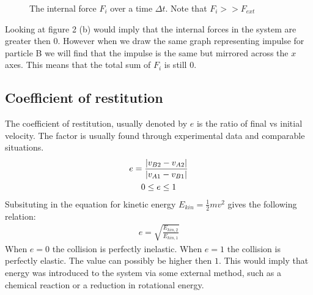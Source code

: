 \documentclass[11pt, a4paper]{article}
\begin{document}
\begin{figure}[h]
  \centering
  \qquad
  \caption{The internal force $F_i$ over a time $\Delta t$. Note that $F_i >> F_{ext}$}
\end{figure}
Looking at figure 2 (b) would imply that the internal forces in the system are greater then $0$. However
when we draw the same graph representing impulse for particle B we will find that the impulse is the same but mirrored across the $x$ axes.
This means that the total sum of $F_i$ is still $0$.


\subsection{Coefficient of restitution}
The coefficient of restitution, usually denoted by $e$ is the ratio of final vs initial velocity.
The factor is usually found through experimental data and comparable situations. 
\begin{gather}
  e = \frac{|v_{B2}-v_{A2}|}{|v_{A1}-v_{B1}|}\\
  0 \leq e \leq 1 \notag
\end{gather}
Subsituting in the equation for kinetic energy $E_{kin} = \frac{1}{2}mv^2$ gives the following relation:
\begin{gather}
  e = \sqrt{\frac{E_{kin,2}}{E_{kin,1}}}
\end{gather}
When $e = 0$ the collision is perfectly inelastic. When $e=1$ the collision is perfectly elastic.
The value can possibly be higher then $1$. This would imply that energy was introduced to the system
via some external method, such as a chemical reaction or a reduction in rotational energy.
\end{document}
